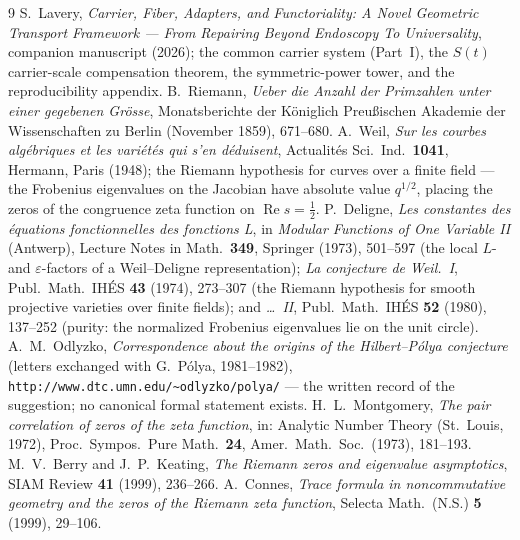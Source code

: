 \documentclass[11pt]{article}
\theoremstyle{definition}
\renewcommand{\Re}{\operatorname{Re}}
\begin{document}
\begin{thebibliography}{9}
 S.~Lavery, \emph{Carrier, Fiber, Adapters, and
Functoriality: A Novel Geometric Transport Framework --- From Repairing
Beyond Endoscopy To Universality}, companion manuscript (2026); the common
carrier system (Part~I), the $S(t)$ carrier-scale compensation theorem, the
symmetric-power tower, and the reproducibility appendix.
 B.~Riemann, \emph{Ueber die Anzahl der Primzahlen unter einer gegebenen
Gr\"osse}, Monatsberichte der K\"oniglich Preu{\ss}ischen Akademie der Wissenschaften zu Berlin
(November 1859), 671--680.
 A.~Weil, \emph{Sur les courbes alg\'ebriques et les vari\'et\'es qui s'en
d\'eduisent}, Actualit\'es Sci.\ Ind.\ \textbf{1041}, Hermann, Paris (1948); the Riemann hypothesis
for curves over a finite field --- the Frobenius eigenvalues on the Jacobian have absolute value
$q^{1/2}$, placing the zeros of the congruence zeta function on $\Re s=\tfrac12$.
 P.~Deligne, \emph{Les constantes des \'equations fonctionnelles des fonctions L},
in \emph{Modular Functions of One Variable II} (Antwerp), Lecture Notes in Math.\ \textbf{349},
Springer (1973), 501--597 (the local $L$- and $\varepsilon$-factors of a Weil--Deligne
representation); \emph{La conjecture de Weil.\ I}, Publ.\ Math.\ IH\'ES \textbf{43} (1974),
273--307 (the Riemann hypothesis for smooth projective varieties over finite fields); and
\emph{\ldots\ II}, Publ.\ Math.\ IH\'ES \textbf{52} (1980), 137--252 (purity: the normalized
Frobenius eigenvalues lie on the unit circle).
 A.~M.~Odlyzko, \emph{Correspondence about the origins of the
Hilbert--P\'olya conjecture} (letters exchanged with G.~P\'olya, 1981--1982),
\texttt{http://www.dtc.umn.edu/\~{}odlyzko/polya/} --- the written record of the suggestion;
no canonical formal statement exists.
 H.~L.~Montgomery, \emph{The pair correlation of zeros of the zeta function},
in: Analytic Number Theory (St.~Louis, 1972), Proc.\ Sympos.\ Pure Math.\ \textbf{24}, Amer.\ Math.\
Soc.\ (1973), 181--193.
 M.~V.~Berry and J.~P.~Keating, \emph{The Riemann zeros and eigenvalue
asymptotics}, SIAM Review \textbf{41} (1999), 236--266.
 A.~Connes, \emph{Trace formula in noncommutative geometry and the zeros of the
Riemann zeta function}, Selecta Math.\ (N.S.) \textbf{5} (1999), 29--106.
\end{thebibliography}
\end{document}

